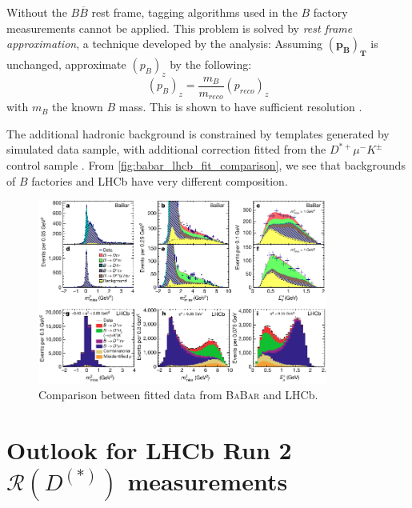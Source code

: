 \documentclass[12pt,letterpaper]{article}
\renewcommand{\vec}[1]{\mathbf{#1}}                   %
\newcommand{\PRLrule}{
    \bigskip
    \noindent\makebox[\linewidth]{
        \resizebox{0.3333\linewidth}{1pt}{$\blacklozenge$}
    }
    \bigskip
}
\def\BaBar/{\textsc{BaBar}}
\def\RDDst/{\ensuremath{\mathcal{R}(D^{(*)})}}
\begin{document}
Without the $B \overline{B}$ rest frame, tagging algorithms used in the $B$
factory measurements cannot be applied.
This problem is solved by \emph{rest frame approximation}, a technique developed
by the analysis:
Assuming $\vec{(p_{B})_T}$ is unchanged, approximate $(p_{B})_z$ by the
following:
\begin{equation}
    (p_{B})_z = \frac{m_B}{m_{reco}} (p_{reco})_z
\end{equation}
with $m_B$ the known $B$ mass.
This is shown to have sufficient resolution \cite{LHCb:PhysRevLett.115.111803}.

The additional hadronic background is constrained by templates generated by
simulated data sample, with additional correction fitted from the
$D^{*+} \mu^- K^{\pm}$ control sample \cite{LHCb:PhysRevLett.115.111803}.
From \autoref{fig:babar_lhcb_fit_comparison}, we see that backgrounds of $B$
factories and LHCb have very different composition.

\begin{figure}[ht]
    \centering
    \includegraphics[width=0.85\textwidth]{figs/babar_lhcb_fit_comparison.pdf}
    \caption{
        Comparison between fitted data from \BaBar/ and LHCb.
    }
    \label{fig:babar_lhcb_fit_comparison}
\end{figure}


\section{Outlook for LHCb Run 2 \RDDst/ measurements}

\PRLrule
\printbibliography
\end{document}
